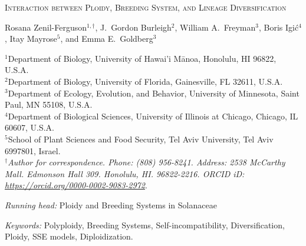 \documentclass[11pt]{article}
\begin{document}


%
\begin{center}
    \textsc{Interaction between Ploidy, Breeding System, and Lineage Diversification}

\vfill

\noindent 
Rosana Zenil-Ferguson$^{1,\dagger}$,
%
J.~Gordon Burleigh$^{2}$,
%
William A.~Freyman$^{3}$,
%
Boris Igi\'c$^{4}$,
%
Itay Mayrose$^{5}$,
%
and Emma E.~Goldberg$^{3}$
%
\end{center}
%
\noindent$^{1}$Department of Biology, University of Hawai'i M\={a}noa, Honolulu, HI 96822, U.S.A.\\
%
\noindent$^{2}$Department of Biology, University of Florida, Gainesville, FL 32611, U.S.A.\\
%
\noindent$^{3}$Department of Ecology, Evolution, and Behavior, University of Minnesota, Saint Paul, MN 55108, U.S.A.\\
%
\noindent$^{4}$Department of Biological Sciences, University of Illinois at Chicago, Chicago, IL 60607, U.S.A. \\
%
\noindent$^{5}$School of Plant Sciences and Food Security, Tel Aviv University, Tel Aviv 6997801, Israel.\\
%
\noindent$^\dagger$\textit{Author for correspondence. Phone: (808) 956-8241. Address: 2538 McCarthy Mall. Edmonson Hall 309. Honolulu, HI. 96822-2216. ORCID iD: \url{https://orcid.org/0000-0002-9083-2972}}.\\

\vfill

\noindent\textit{Running head:} 
Ploidy and Breeding Systems in Solanaceae

\noindent \textit{Keywords:} 
Polyploidy,
Breeding Systems,
Self-incompatibility,
Diversification, 
Ploidy,
SSE models,
Diploidization.

\vfill

\linenumbers


\clearpage


\end{document}
